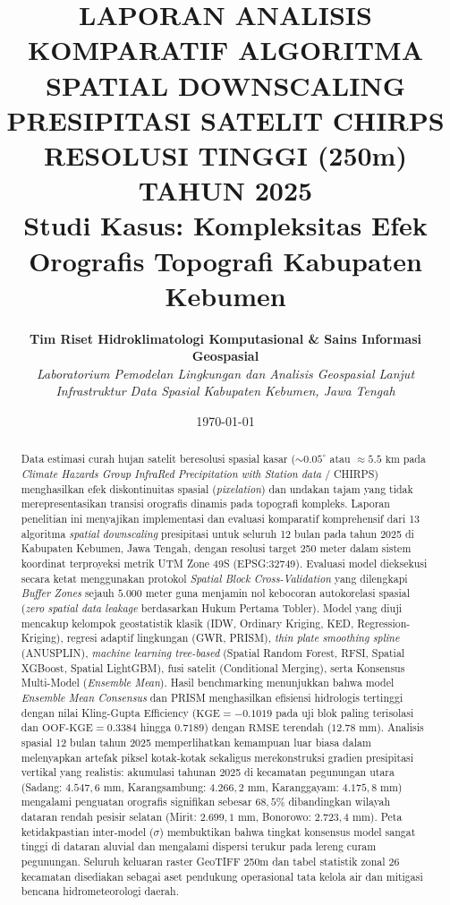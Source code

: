 \documentclass[11pt,a4paper]{article}
\title{
    \vspace{-1.0cm}
    \textbf{\Large LAPORAN ANALISIS KOMPARATIF ALGORITMA SPATIAL DOWNSCALING PRESIPITASI SATELIT CHIRPS RESOLUSI TINGGI (250m) TAHUN 2025}\\[0.3cm]
    \textbf{\large Studi Kasus: Kompleksitas Efek Orografis Topografi Kabupaten Kebumen}
}
\author{
    \textbf{Tim Riset Hidroklimatologi Komputasional \& Sains Informasi Geospasial}\\
    \textit{Laboratorium Pemodelan Lingkungan dan Analisis Geospasial Lanjut}\\
    \textit{Infrastruktur Data Spasial Kabupaten Kebumen, Jawa Tengah}
}
\date{\today}
\begin{document}

\maketitle

\begin{abstract}
\noindent Data estimasi curah hujan satelit beresolusi spasial kasar ($\sim 0.05^\circ$ atau $\approx 5.5\text{ km}$ pada \textit{Climate Hazards Group InfraRed Precipitation with Station data} / CHIRPS) menghasilkan efek diskontinuitas spasial (\textit{pixelation}) dan undakan tajam yang tidak merepresentasikan transisi orografis dinamis pada topografi kompleks. Laporan penelitian ini menyajikan implementasi dan evaluasi komparatif komprehensif dari 13 algoritma \textit{spatial downscaling} presipitasi untuk seluruh 12 bulan pada tahun 2025 di Kabupaten Kebumen, Jawa Tengah, dengan resolusi target 250 meter dalam sistem koordinat terproyeksi metrik UTM Zone 49S (EPSG:32749). Evaluasi model dieksekusi secara ketat menggunakan protokol \textit{Spatial Block Cross-Validation} yang dilengkapi \textit{Buffer Zones} sejauh $5.000\text{ meter}$ guna menjamin nol kebocoran autokorelasi spasial (\textit{zero spatial data leakage} berdasarkan Hukum Pertama Tobler). Model yang diuji mencakup kelompok geostatistik klasik (IDW, Ordinary Kriging, KED, Regression-Kriging), regresi adaptif lingkungan (GWR, PRISM), \textit{thin plate smoothing spline} (ANUSPLIN), \textit{machine learning tree-based} (Spatial Random Forest, RFSI, Spatial XGBoost, Spatial LightGBM), fusi satelit (Conditional Merging), serta Konsensus Multi-Model (\textit{Ensemble Mean}). Hasil benchmarking menunjukkan bahwa model \textit{Ensemble Mean Consensus} dan PRISM menghasilkan efisiensi hidrologis tertinggi dengan nilai Kling-Gupta Efficiency ($\text{KGE} = -0.1019$ pada uji blok paling terisolasi dan $\text{OOF-KGE} = 0.3384$ hingga $0.7189$) dengan $\text{RMSE}$ terendah ($12.78\text{ mm}$). Analisis spasial 12 bulan tahun 2025 memperlihatkan kemampuan luar biasa dalam melenyapkan artefak piksel kotak-kotak sekaligus merekonstruksi gradien presipitasi vertikal yang realistis: akumulasi tahunan 2025 di kecamatan pegunungan utara (Sadang: $4.547,6\text{ mm}$, Karangsambung: $4.266,2\text{ mm}$, Karanggayam: $4.175,8\text{ mm}$) mengalami penguatan orografis signifikan sebesar $68,5\%$ dibandingkan wilayah dataran rendah pesisir selatan (Mirit: $2.699,1\text{ mm}$, Bonorowo: $2.723,4\text{ mm}$). Peta ketidakpastian inter-model ($\sigma$) membuktikan bahwa tingkat konsensus model sangat tinggi di dataran aluvial dan mengalami dispersi terukur pada lereng curam pegunungan. Seluruh keluaran raster GeoTIFF 250m dan tabel statistik zonal 26 kecamatan disediakan sebagai aset pendukung operasional tata kelola air dan mitigasi bencana hidrometeorologi daerah.
\end{abstract}
\end{document}
